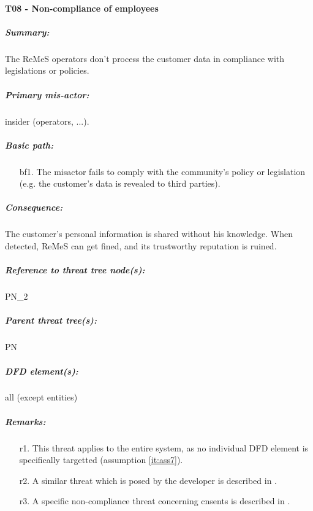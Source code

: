 

\paragraph{T08 - Non-compliance of employees}
\label{par:t09}
    \subparagraph{Summary:} The ReMeS operators don't process the customer data in compliance with legislations or policies.
    \subparagraph{Primary mis-actor:} insider (operators, ...).
    \subparagraph{Basic path:}
    \begin{enumerate}
        \item[bf1.] The misactor fails to comply with the community's policy or legislation (e.g. the customer's
data is revealed to third parties).
    \end{enumerate}
    \subparagraph{Consequence:} The customer's personal information is shared without his knowledge. When
detected, ReMeS can get fined, and its trustworthy reputation is ruined.


    \subparagraph{Reference to threat tree node(s):} PN\_2
    \subparagraph{Parent threat tree(s):} PN
    \subparagraph{DFD element(s):} all (except entities)
    \subparagraph{Remarks:}
    \begin{enumerate}
        \item[r1.] This threat applies to the entire system, as no individual DFD element is specifically targetted (assumption \ref{it:ass7}).
        \item[r2.] A similar threat which is posed by the developer is described in .
		\item[r3.] A specific non-compliance threat concerning cnsents is described in .
    \end{enumerate}



